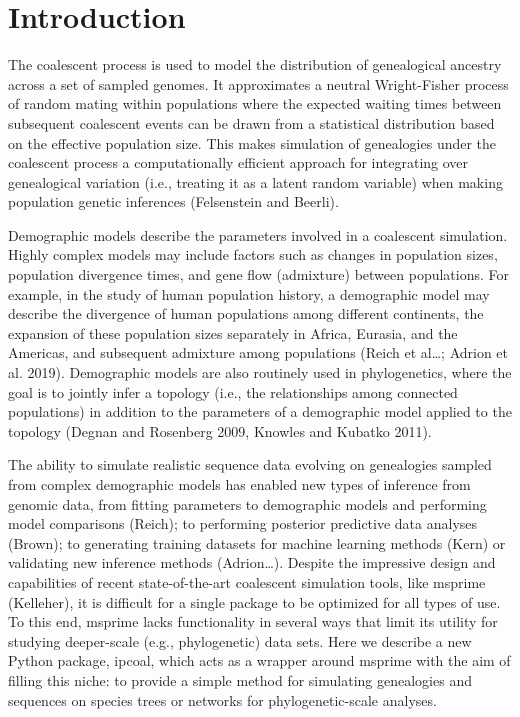 \documentclass[11pt]{article}
\begin{document}
\RaggedRight
\bigskip

\section{Introduction}
The coalescent process \cite{kingman_coalescent_1982,hudson_testing_1983} is used to model the distribution of genealogical ancestry across a set of sampled genomes. It approximates a neutral Wright-Fisher process of random mating within populations where the expected waiting times between subsequent coalescent events can be drawn from a statistical distribution based on the effective population size. This makes simulation of genealogies under the coalescent process \cite{hudson_generating_2002} a computationally efficient approach for integrating over genealogical variation (i.e., treating it as a latent random variable) when making population genetic inferences \cite{}(Felsenstein and Beerli). 

Demographic models describe the parameters involved in a coalescent simulation. Highly complex models may include factors such as changes in population sizes, population divergence times, and gene flow (admixture) between populations. For example, in the study of human population history, a demographic model may describe the divergence of human populations among different continents, the expansion of these population sizes separately in Africa, Eurasia, and the Americas, and subsequent admixture among populations (Reich et al…; Adrion et al. 2019). Demographic models are also routinely used in phylogenetics, where the goal is to jointly infer a topology (i.e., the relationships among connected populations) in addition to the parameters of a demographic model applied to the topology (Degnan and Rosenberg 2009, Knowles and Kubatko 2011). 

The ability to simulate realistic sequence data evolving on genealogies sampled from complex demographic models has enabled new types of inference from genomic data, from fitting parameters to demographic models and performing model comparisons (Reich); to performing posterior predictive data analyses (Brown); to generating training datasets for machine learning methods (Kern) or validating new inference methods (Adrion…). Despite the impressive design and capabilities of recent state-of-the-art coalescent simulation tools, like msprime (Kelleher), it is difficult for a single package to be optimized for all types of use. To this end, msprime lacks functionality in several ways that limit its utility for studying deeper-scale (e.g., phylogenetic) data sets. Here we describe a new Python package, ipcoal, which acts as a wrapper around msprime with the aim of filling this niche: to provide a simple method for simulating genealogies and sequences on species trees or networks for phylogenetic-scale analyses.
\end{document}

